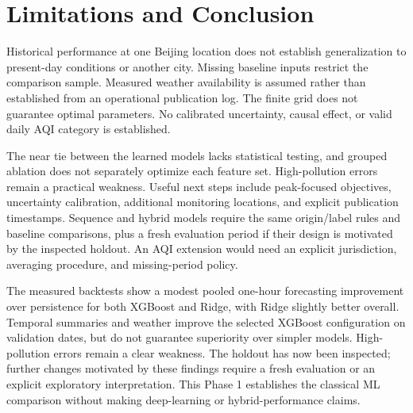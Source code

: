 \documentclass[conference]{IEEEtran}
\begin{document}
\section{Limitations and Conclusion}
Historical performance at one Beijing location does not establish generalization to present-day conditions or another city. Missing baseline inputs restrict the comparison sample. Measured weather availability is assumed rather than established from an operational publication log. The finite grid does not guarantee optimal parameters. No calibrated uncertainty, causal effect, or valid daily AQI category is established.\par
The near tie between the learned models lacks statistical testing, and grouped ablation does not separately optimize each feature set. High-pollution errors remain a practical weakness. Useful next steps include peak-focused objectives, uncertainty calibration, additional monitoring locations, and explicit publication timestamps. Sequence and hybrid models require the same origin/label rules and baseline comparisons, plus a fresh evaluation period if their design is motivated by the inspected holdout. An AQI extension would need an explicit jurisdiction, averaging procedure, and missing-period policy.\par
The measured backtests show a modest pooled one-hour forecasting improvement over persistence for both XGBoost and Ridge, with Ridge slightly better overall. Temporal summaries and weather improve the selected XGBoost configuration on validation dates, but do not guarantee superiority over simpler models. High-pollution errors remain a clear weakness. The holdout has now been inspected; further changes motivated by these findings require a fresh evaluation or an explicit exploratory interpretation. This Phase 1 establishes the classical ML comparison without making deep-learning or hybrid-performance claims.


\end{document}
